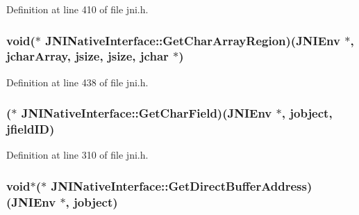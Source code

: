 Definition at line 410 of file jni.\-h.

\hypertarget{struct_j_n_i_native_interface_a409a7530dcc1765a5aa647d4920040e7}{
\subsubsection[{Get\-Char\-Array\-Region}]{\setlength{\rightskip}{0pt plus 5cm}void($\ast$ J\-N\-I\-Native\-Interface\-::\-Get\-Char\-Array\-Region)({\bf J\-N\-I\-Env} $\ast$, {\bf jchar\-Array}, {\bf jsize}, {\bf jsize}, {\bf jchar} $\ast$)}}\label{struct_j_n_i_native_interface_a409a7530dcc1765a5aa647d4920040e7}


Definition at line 438 of file jni.\-h.

\hypertarget{struct_j_n_i_native_interface_a3bc2b84da800f16ab6b39a70663e3899}{
\subsubsection[{Get\-Char\-Field}]{($\ast$ J\-N\-I\-Native\-Interface\-::\-Get\-Char\-Field)({\bf J\-N\-I\-Env} $\ast$, {\bf jobject}, {\bf jfield\-I\-D})}}\label{struct_j_n_i_native_interface_a3bc2b84da800f16ab6b39a70663e3899}


Definition at line 310 of file jni.\-h.

\hypertarget{struct_j_n_i_native_interface_a6bfed70962e72ade68fb5b45f2994e6c}{
\subsubsection[{Get\-Direct\-Buffer\-Address}]{\setlength{\rightskip}{0pt plus 5cm}void$\ast$($\ast$ J\-N\-I\-Native\-Interface\-::\-Get\-Direct\-Buffer\-Address)({\bf J\-N\-I\-Env} $\ast$, {\bf jobject})}}\label{struct_j_n_i_native_interface_a6bfed70962e72ade68fb5b45f2994e6c}


